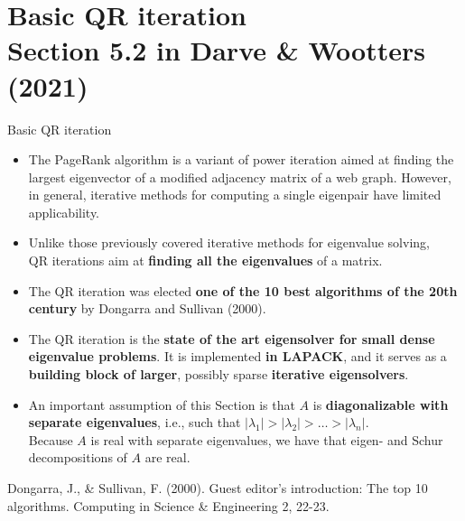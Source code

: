 \documentclass[t,usepdftitle=false]{beamer}
\begin{document}
\section{Basic QR iteration\\{\small Section 5.2 in Darve \& Wootters (2021)}}

\begin{frame}{Basic QR iteration}
\begin{itemize}
\item The PageRank algorithm is a variant of power iteration aimed at finding the largest eigenvector of a modified adjacency matrix of a web graph.\vspace{.05cm}
However, in general, iterative methods for computing a single eigenpair have limited applicability.
\item Unlike those previously covered iterative methods for eigenvalue solving,\\
QR iterations aim at \textbf{finding all the eigenvalues} of a matrix.
\item The QR iteration was elected \textbf{one of the 10 best algorithms of the 20th century} by Dongarra and Sullivan (2000).
\item The QR iteration is the \textbf{state of the art eigensolver for small dense eigenvalue problems}.
It is implemented \textbf{in LAPACK}, and it serves as a \textbf{building block of larger}, possibly sparse \textbf{iterative eigensolvers}.
\item An important assumption of this Section is that $A$ is \textbf{diagonalizable with separate eigenvalues}, i.e., such that $|\lambda_1|>|\lambda_2|>\dots>|\lambda_n|$.\vspace{.1cm}\\
Because $A$ is real with separate eigenvalues, we have that eigen- and Schur decompositions of $A$ are real.
\end{itemize}
\tiny{Dongarra, J., \& Sullivan, F. (2000). Guest editor's introduction: The top 10 algorithms. Computing in Science \& Engineering 2, 22-23.}
\end{frame}
\end{document}
